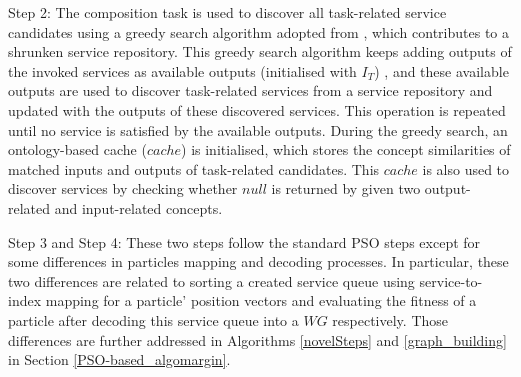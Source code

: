 Step 2: The composition task is used to discover all task-related service candidates using a greedy search algorithm adopted from \cite{ma2015hybrid}, which contributes to a shrunken service repository. This greedy search algorithm keeps adding outputs of the invoked services as available outputs (initialised with $I_{T}$) , and these available outputs are used to discover task-related services from a service repository and updated with the outputs of these discovered services. This operation is repeated until no service is satisfied by the available outputs. During the greedy search, an ontology-based cache ($cache$) is initialised, which stores the concept similarities of matched inputs and outputs of task-related candidates. This $cache$ is also used to discover services by checking whether $null$ is returned by given two output-related and input-related concepts.

Step 3 and Step 4: These two steps follow the standard PSO steps \cite{shi2001particle} except for some differences in particles mapping and decoding processes. In particular, these two differences are related to sorting a created service queue using service-to-index mapping for a particle' position vectors and evaluating the fitness of a particle after decoding this service queue into a $WG$ respectively. Those differences are further addressed in Algorithms \ref{novelSteps} and \ref{graph_building} in Section \ref{PSO-based_algomargin}.
